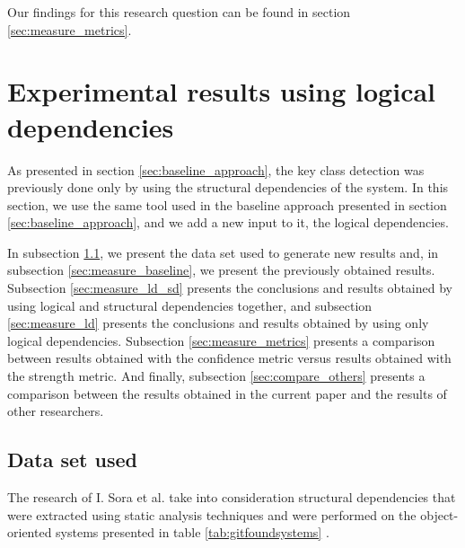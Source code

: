 \documentclass[runningheads]{comsis2}
\begin{document}
\medskip

\noindent{}

\medskip
Our findings for this research question can be found in section \ref{sec:measure_metrics}.

\section{Experimental results using logical dependencies}
\label{sec:current_measurements}


As presented in section \ref{sec:baseline_approach}, the key class detection was previously done only by using the structural dependencies of the system. 
In this section, we use the same tool used in the baseline approach presented in section \ref{sec:baseline_approach}, and we add a new input to it, the logical dependencies. 

In subsection \ref{sec:dataset}, we present the data set used to generate new results and, in subsection \ref{sec:measure_baseline}, we present the previously obtained results. Subsection \ref{sec:measure_ld_sd} presents the conclusions and results obtained by using logical and structural dependencies together, and subsection \ref{sec:measure_ld} presents the conclusions and results obtained by using only logical dependencies. Subsection \ref{sec:measure_metrics} presents a comparison between results obtained with the confidence metric versus results obtained with the strength metric. And finally, subsection \ref{sec:compare_others} presents a comparison between the results obtained in the current paper and the results of other researchers.


\subsection{Data set used}
\label{sec:dataset}


The research of I. Sora et al. take into consideration structural dependencies that were extracted using static analysis techniques and were performed on the object-oriented systems presented in table \ref{tab:gitfoundsystems} \cite{Finding-key-classes}.
\end{document}

